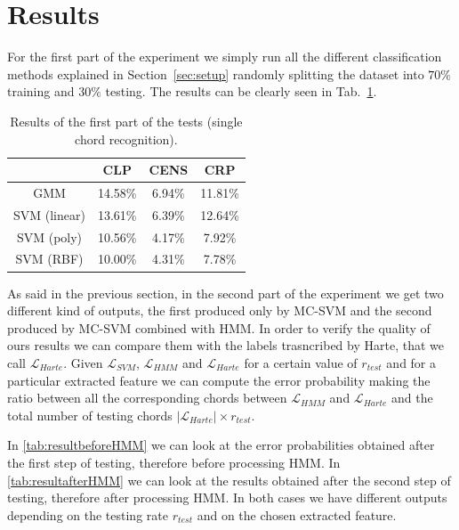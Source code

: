 \section{Results}
\label{sec:results}

For the first part of the experiment we simply run all the different classification methods explained in Section~\ref{sec:setup} randomly splitting the dataset into $70\%$ training and $30\%$ testing. The results can be clearly seen in Tab.~\ref{tab:singleChordResults}.

\begin{table}[t]
\centering
\begin{tabular}{|c|c|c|c|}
	\hline 
	& CLP & CENS & CRP \\ 
	\hline 
	GMM & 14.58\% & 6.94\% & 11.81\% \\ 
	\hline 
	SVM (linear) & 13.61\% & 6.39\% & 12.64\% \\ 
	\hline 
	SVM (poly) & 10.56\% & 4.17\% & 7.92\% \\ 
	\hline 
	SVM (RBF) & 10.00\% & 4.31\% & 7.78\% \\ 
	\hline 
\end{tabular}
\caption{Results of the first part of the tests (single chord recognition).}
\label{tab:singleChordResults}
\end{table} 


As said in the previous section, in the second part of the experiment we get two different kind of outputs, the first produced only by MC-SVM and the second produced by MC-SVM combined with HMM. In order to verify the quality of ours results we can compare them with the labels trasncribed by Harte, that we call $\mathcal{L}_{Harte}$. Given $\mathcal{L}_{SVM}$, $\mathcal{L}_{HMM}$ and $\mathcal{L}_{Harte}$ for a certain value of $r_{test}$ and for a particular extracted feature we can compute the error probability making the ratio between all the corresponding chords between $\mathcal{L}_{HMM}$ and $\mathcal{L}_{Harte}$ and the total number of testing chords $|\mathcal{L}_{Harte}| \times r_{test}$. 


 In \ref{tab:resultbeforeHMM} we can look at the error probabilities obtained after the first step of testing, therefore before processing HMM. In \ref{tab:resultafterHMM} we can look at the results obtained after the second step of testing, therefore after processing HMM. In both cases we have different outputs depending on the testing rate $r_{test}$ and on the chosen extracted feature.

